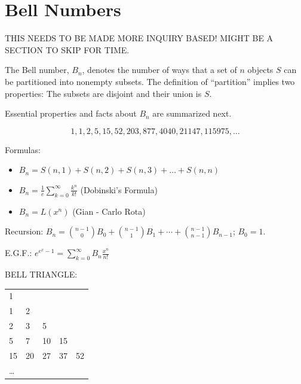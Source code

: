 \documentclass[10pt,]{book}
\theoremstyle{plain}
\theoremstyle{definition}
\theoremstyle{definition}
\theoremstyle{definition}
\theoremstyle{definition}
\numberwithin{equation}{chapter}
\begin{document}
\section[{Bell Numbers}]{Bell Numbers}\label{sec_adv-bell}
\hypertarget{p-1124}{}%
THIS NEEDS TO BE MADE MORE INQUIRY BASED!  MIGHT BE A SECTION TO SKIP FOR TIME.%
\par
\hypertarget{p-1125}{}%
The Bell number, \(B_{n}\), denotes the number of ways that a set of \(n\) objects \(S\) can be partitioned into nonempty subsets. The definition of ``partition'' implies two properties: The subsets are disjoint and their union is \(S\).%
\par
\hypertarget{p-1126}{}%
Essential properties and facts about \(B_{n}\) are summarized next.%
\begin{assemblage}\label{assemblage-14}
\hypertarget{p-1127}{}%
%
\begin{equation*}
1, 1, 2, 5, 15, 52, 203, 877, 4040, 21147, 115975, \ldots
\end{equation*}
%
\par
\hypertarget{p-1128}{}%
Formulas: %
\begin{itemize}[label=\textbullet]
\item{}\(B_{n} = S\left( n,1 \right) + S\left( n,2 \right) + S\left( n,3 \right) + \ldots + S(n,n)\)%
\item{}\(B_{n} = \frac{1}{e}\sum_{k=0}^{\infty}\frac{k^{n}}{k!}\) (Dobinski's Formula)%
\item{}\(B_{n} = L\left( x^{n} \right)\) (Gian - Carlo Rota)%
\end{itemize}
%
\par
\hypertarget{p-1129}{}%
Recursion: \(B_{n} = \binom{n - 1}{0}B_{0} + \binom{n - 1}{1}B_{1} + \cdots + \binom{n - 1}{n - 1}B_{n - 1}\); \(B_{0} = 1\).%
\par
\hypertarget{p-1130}{}%
E.G.F.: \(e^{e^{x} - 1} = \sum_{k = 0}^{\infty}{B_{n}\frac{x^{n}}{n!}}\)%
\par
\hypertarget{p-1131}{}%
BELL TRIANGLE:%
\begin{sidebyside}{1}{0.25}{0.25}{0}
\begin{sbspanel}{0.5}
{\centering%
\begin{tabular}{lllll}
1&&&&\tabularnewline[0pt]
1&2&&&\tabularnewline[0pt]
2&3&5&&\tabularnewline[0pt]
5&7&10&15&\tabularnewline[0pt]
15&20&27&37&52\tabularnewline[0pt]
\ldots&&&&
\end{tabular}
\par}
\end{sbspanel}
\end{sidebyside}
\end{assemblage}
\end{document}
